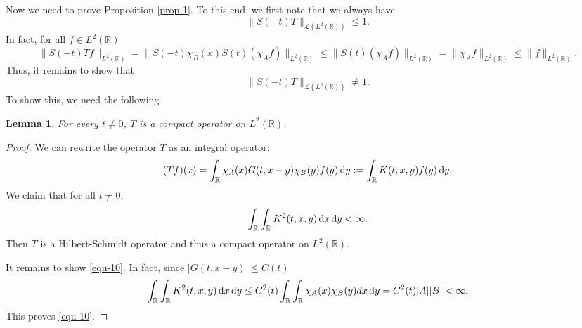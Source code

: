 \documentclass[12pt]{amsart}
\def\R {\mathbb{R}}
\def\d{{\,\rm d}}
\newtheorem{lemma}[proposition]{Lemma}
\theoremstyle{definition}
\numberwithin{equation}{section}
\begin{document}
Now we need to prove Proposition \ref{prop-1}. To this end, we first note that we always have
$$
\|S(-t)T\|_{\mathcal {L}(L^2(\R))}\leq 1.
$$
In fact, for all $f\in L^2(\R)$
$$
\|S(-t)Tf\|_{L^2(\R)}= \|S(-t)\chi_B(x)S(t)(\chi_Af)\|_{L^2(\R)}\leq \|S(t)(\chi_Af)\|_{L^2(\R)}=\|\chi_Af\|_{L^2(\R)}\leq \|f\|_{L^2(\R)}.
$$
Thus, it remains to show that
$$
\|S(-t)T\|_{\mathcal {L}(L^2(\R))}\neq 1.
$$
To show this, we need the following
\begin{lemma}\label{lma-3}
For every $t\neq 0$, $T$ is a compact operator on $L^2(\R)$.
\end{lemma}
\begin{proof}
We can rewrite the operator $T$ as an integral operator:
$$
(Tf)(x)=\int_{\R}\chi_A(x)G(t,x-y)\chi_B(y)f(y)\d y:=\int_\R K(t,x,y)f(y)\d y.
$$
We claim that for all $t \neq 0$,
\begin{align}\label{equ-10}
 \int_\R\int_\R K^2(t,x,y)\d x \d y<\infty.
\end{align}
Then $T$ is a Hilbert-Schmidt operator and thus a compact operator on $L^2(\R)$.

It remains to show \eqref{equ-10}. In fact, since $|G(t,x-y)|\leq C(t)$
\begin{align*}
 \int_\R\int_\R K^2(t,x,y)\d x \d y\leq  C^2(t) \int_\R\int_\R \chi_A(x)\chi_B(y)d x \d y=C^2(t)|A||B|<\infty.
\end{align*}
This proves \eqref{equ-10}.
\end{proof}
\end{document}
